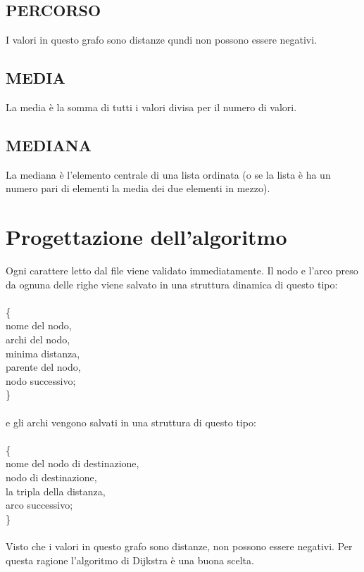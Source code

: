 \documentclass[11pt, a4paper, titlepage, block]{article}
\begin{document}
	\subsection{PERCORSO}
	I valori in questo grafo sono distanze qundi non possono essere negativi.
	\subsection{MEDIA}
	La media \`{e} la somma di tutti i valori divisa per il numero di valori.
	\subsection{MEDIANA}
	La mediana \`{e} l'elemento centrale di una lista ordinata (o se la lista \`{e} ha un numero pari di elementi la media dei due elementi in mezzo).\\

	\newpage
\section{Progettazione dell'algoritmo}
	Ogni carattere letto dal file viene validato immediatamente. Il nodo e l'arco preso da ognuna delle righe viene salvato in una struttura dinamica di questo tipo: \\\\
	\{\\
	\indent nome del nodo,\\
	\indent archi del nodo,\\
	\indent minima distanza,\\
	\indent parente del nodo,\\
	\indent nodo successivo; \\
	\}\\\\
	e gli archi vengono salvati in una struttura di questo tipo:\\\\
	\{\\
	\indent nome del nodo di destinazione,\\
	\indent nodo di destinazione,\\
	\indent la tripla della distanza,\\
	\indent arco successivo;\\
	\}\\\\

	Visto che i valori in questo grafo sono distanze, non possono essere negativi. Per questa ragione l'algoritmo di Dijkstra \`{e} una buona scelta.\\\\
	
\end{document}
